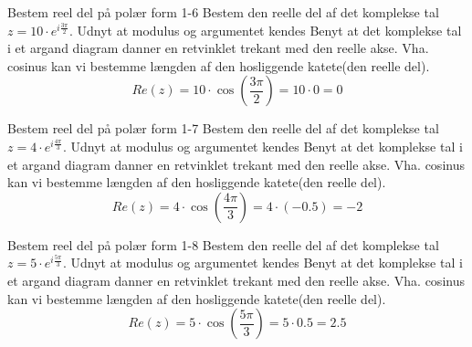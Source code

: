 \documentclass{article}
\begin{document}
\newpage
\begin{exercise}{Bestem reel del på polær form 1-6}
Bestem den reelle del af det komplekse tal $z = 10 \cdot e^{i \frac{3 \pi}{2}}$.
\hint
Udnyt at modulus og argumentet kendes
\hint
Benyt at det komplekse tal i et argand diagram danner en retvinklet trekant med den reelle akse.
\hint
Vha. cosinus kan vi bestemme længden af den hosliggende katete(den reelle del).
\[Re(z) = 10 \cdot \cos\left(\frac{3 \pi}{2} \right) = 10 \cdot 0 = 0
\]
\end{exercise}
\newpage
\begin{exercise}{Bestem reel del på polær form 1-7}
Bestem den reelle del af det komplekse tal $z = 4 \cdot e^{i \frac{4 \pi}{3}}$.
\hint
Udnyt at modulus og argumentet kendes
\hint
Benyt at det komplekse tal i et argand diagram danner en retvinklet trekant med den reelle akse.
\hint
Vha. cosinus kan vi bestemme længden af den hosliggende katete(den reelle del).
\[Re(z) = 4 \cdot \cos\left(\frac{4 \pi}{3} \right) = 4 \cdot (-0.5) = - 2
\]
\end{exercise}
\newpage
\begin{exercise}{Bestem reel del på polær form 1-8}
Bestem den reelle del af det komplekse tal $z = 5 \cdot e^{i \frac{5 \pi}{3}}$.
\hint
Udnyt at modulus og argumentet kendes
\hint
Benyt at det komplekse tal i et argand diagram danner en retvinklet trekant med den reelle akse.
\hint
Vha. cosinus kan vi bestemme længden af den hosliggende katete(den reelle del).
\[Re(z) = 5 \cdot \cos\left(\frac{5 \pi}{3} \right) = 5 \cdot 0.5 = 2.5
\]
\end{exercise}
\end{document}
